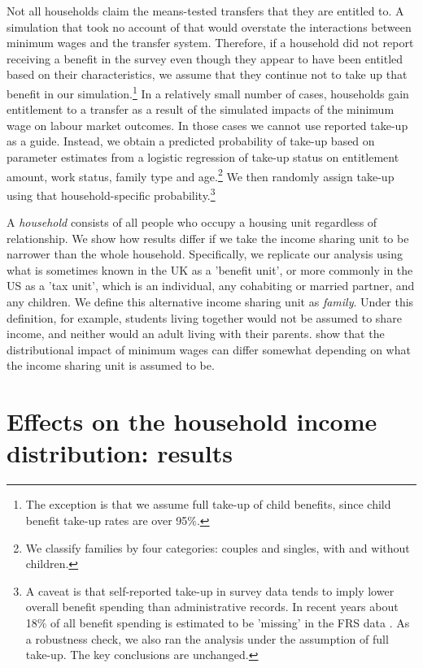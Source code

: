 Not all households claim the means-tested transfers that they are entitled to. A simulation that took no account of that would overstate the interactions between minimum wages and the transfer system. Therefore, if a household did not report receiving a benefit in the survey even though they appear to have been entitled based on their characteristics, we assume that they continue not to take up that benefit in our simulation.\footnote{The exception is that we assume full take-up of child benefits, since child benefit take-up rates are over 95\%.} In a relatively small number of cases, households gain entitlement to a transfer as a result of the simulated impacts of the minimum wage on labour market outcomes. In those cases we cannot use reported take-up as a guide. Instead, we obtain a predicted probability of take-up based on parameter estimates from a logistic regression of take-up status on entitlement amount, work status, family type and age.\footnote{We classify families by four categories: couples and singles, with and without children.} We then randomly assign take-up using that household-specific probability.\footnote{A caveat is that self-reported take-up in survey data tends to imply lower overall benefit spending than administrative records. In recent years about 18\% of all benefit spending is estimated to be 'missing' in the FRS data \citep{Corlett2021}. As a robustness check, we also ran the analysis under the assumption of full take-up. The key conclusions are unchanged.}



A \textit{household} consists of all people who occupy a housing unit regardless of relationship. We show how results differ if we take the income sharing unit to be narrower than the whole household. Specifically, we replicate our analysis using what is sometimes known in the UK as a 'benefit unit', or more commonly in the US as a 'tax unit', which is an individual, any cohabiting or married partner, and any children. We define this alternative income sharing unit as \textit{family}. Under this definition, for example, students living together would not be assumed to share income, and neither would an adult living with their parents. \cite{Brewer2017} show that the distributional impact of minimum wages can differ somewhat depending on what the income sharing unit is assumed to be.


\section{Effects on the household income distribution: results} \label{sec:hh_results}


